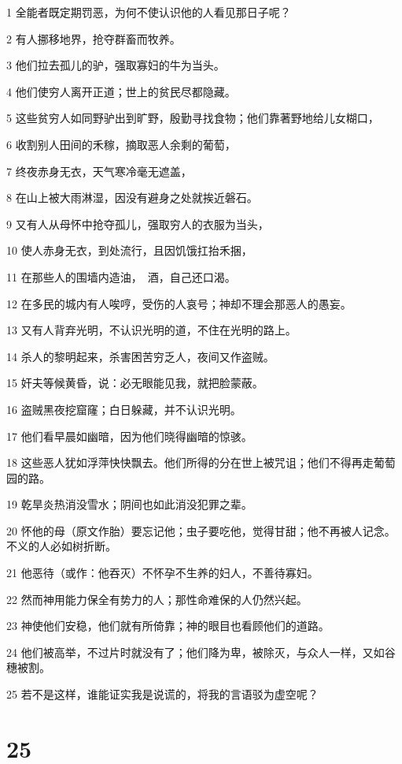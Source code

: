 \par 1 全能者既定期罚恶，为何不使认识他的人看见那日子呢？
\par 2 有人挪移地界，抢夺群畜而牧养。
\par 3 他们拉去孤儿的驴，强取寡妇的牛为当头。
\par 4 他们使穷人离开正道；世上的贫民尽都隐藏。
\par 5 这些贫穷人如同野驴出到旷野，殷勤寻找食物；他们靠著野地给儿女糊口，
\par 6 收割别人田间的禾稼，摘取恶人余剩的葡萄，
\par 7 终夜赤身无衣，天气寒冷毫无遮盖，
\par 8 在山上被大雨淋湿，因没有避身之处就挨近磐石。
\par 9 又有人从母怀中抢夺孤儿，强取穷人的衣服为当头，
\par 10 使人赤身无衣，到处流行，且因饥饿扛抬禾捆，
\par 11 在那些人的围墙内造油，　酒，自己还口渴。
\par 12 在多民的城内有人唉哼，受伤的人哀号；神却不理会那恶人的愚妄。
\par 13 又有人背弃光明，不认识光明的道，不住在光明的路上。
\par 14 杀人的黎明起来，杀害困苦穷乏人，夜间又作盗贼。
\par 15 奸夫等候黄昏，说：必无眼能见我，就把脸蒙蔽。
\par 16 盗贼黑夜挖窟窿；白日躲藏，并不认识光明。
\par 17 他们看早晨如幽暗，因为他们晓得幽暗的惊骇。
\par 18 这些恶人犹如浮萍快快飘去。他们所得的分在世上被咒诅；他们不得再走葡萄园的路。
\par 19 乾旱炎热消没雪水；阴间也如此消没犯罪之辈。
\par 20 怀他的母（原文作胎）要忘记他；虫子要吃他，觉得甘甜；他不再被人记念。不义的人必如树折断。
\par 21 他恶待（或作：他吞灭）不怀孕不生养的妇人，不善待寡妇。
\par 22 然而神用能力保全有势力的人；那性命难保的人仍然兴起。
\par 23 神使他们安稳，他们就有所倚靠；神的眼目也看顾他们的道路。
\par 24 他们被高举，不过片时就没有了；他们降为卑，被除灭，与众人一样，又如谷穗被割。
\par 25 若不是这样，谁能证实我是说谎的，将我的言语驳为虚空呢？

\chapter{25}

